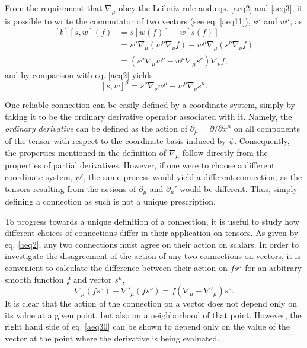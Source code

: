 \documentclass[
12pt,		%
openright,	%
twoside,  %
a4paper,			%
chapter=TITLE,		%
english,			%
french,				%
spanish,			%
brazil				%
]{USPSC-classe/USPSC}
\begin{document}
\begin{apendicesenv}
From the requirement that $\nabla_{\mu}$ obey the Leibniz rule and eqs. \ref{aeq2} and \ref{aeq3}, it is possible to write the commutator of two vectors (see eq. \ref{aeq11}), $s^{\mu}$ and $w^{\mu}$, as
\begin{equation}
    \begin{aligned}[b]
    [s,w](f)& =s[w(f)]-w[s(f)]\\
    &=s^{\mu}\nabla_{\mu}(w^{\nu}\nabla_{\nu}f)-w^{\mu}\nabla_{\mu}(s^{\nu}\nabla_{\nu}f)\\
    &=(s^{\mu}\nabla_{\mu}w^{\nu}-w^{\mu}\nabla_{\mu}s^{\nu})\nabla_{\nu}f,   
    \end{aligned}
\end{equation}
and by comparison with eq. \ref{aeq2} yields
\begin{equation}\label{commu}
    [s,w]^{\mu}=s^{\nu}\nabla_{\nu}w^{\mu}-w^{\nu}\nabla_{\nu}s^{\mu}.
\end{equation}


One reliable connection can be easily defined by a coordinate system, simply by taking it to be the ordinary derivative operator associated with it. Namely, the \textit{ordinary derivative} can be defined as the action of $\partial_{\mu}=\partial/\partial x^{\mu}$ on all components of the tensor with respect to the coordinate basis induced by $\psi$. Consequently, the properties mentioned in the definition of $\nabla_{\mu}$ follow directly from the properties of partial derivatives. However, if one were to choose a different coordinate system, $\psi'$, the same process would yield a different connection, as the tensors resulting from the actions of $\partial_{\mu}$ and $\partial_{\mu}'$ would be different. Thus, simply defining a connection as such is not a unique prescription.

To progress towards a unique definition of a connection, it is useful to study how different choices of connections differ in their application on tensors. As given by eq. \ref{aeq2}, any two connections must agree on their action on scalars. In order to investigate the disagreement of the action of any two connections on vectors, it is convenient to calculate the difference between their action on $fs^{\mu}$ for an arbitrary smooth function $f$ and vector $s^{\mu}$,
\begin{equation}\label{aeq30}
    \nabla_{\mu}(fs^{\nu})-\nabla'_{\mu}(fs^{\nu})=f(\nabla_{\mu}-\nabla'_{\mu})s^{\nu}.
\end{equation}
It is clear that the action of the connection on a vector does not depend only on its value at a given point, but also on a neighborhood of that point. However, the right hand side of eq. \ref{aeq30} can be shown to depend only on the value of the vector at the point where the derivative is being evaluated. 


\end{apendicesenv}
\end{document}
